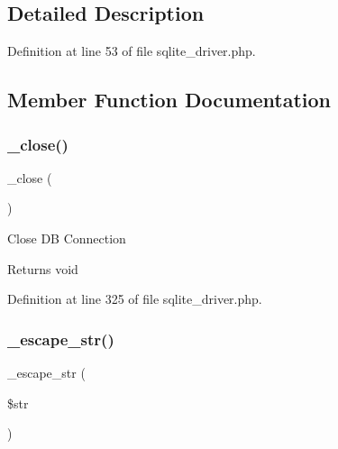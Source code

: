 \subsection{Detailed Description}


Definition at line 53 of file sqlite\+\_\+driver.\+php.



\subsection{Member Function Documentation}
\mbox{\label{class_c_i___d_b__sqlite__driver_a4d9082658000e5ede8312067c6dda9db}} 
\subsubsection{\texorpdfstring{\_close()}{\_close()}}
{\footnotesize\ttfamily \+\_\+close (\begin{DoxyParamCaption}{ }\end{DoxyParamCaption})\hspace{0.3cm}{\ttfamily [protected]}}

Close DB Connection

\begin{DoxyReturn}{Returns}
void 
\end{DoxyReturn}


Definition at line 325 of file sqlite\+\_\+driver.\+php.

\mbox{\label{class_c_i___d_b__sqlite__driver_af8ef0237bfcdb19215b63fff769e7a55}} 
\subsubsection{\texorpdfstring{\_escape\_str()}{\_escape\_str()}}
{\footnotesize\ttfamily \+\_\+escape\+\_\+str (\begin{DoxyParamCaption}\item[{}]{\$str }\end{DoxyParamCaption})\hspace{0.3cm}{\ttfamily [protected]}}

